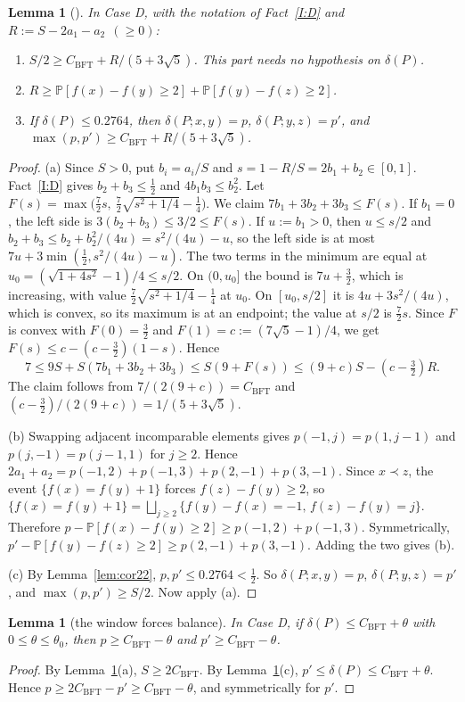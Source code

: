 \documentclass[10pt]{amsart}
\newtheorem{lemma}[theorem]{Lemma}
\theoremstyle{definition}
\theoremstyle{remark}
\newcommand{\PP}{\mathbb{P}}
\newcommand{\CB}{C_{\mathrm{BFT}}}
\begin{document}
\begin{lemma}[{\cite[Lemma~2.4]{KSBFT}}]\label{lem:24}
In Case D, with the notation of Fact~\ref{I:D} and $R:=S-2a_1-a_2\ \ (\ge0)$:
\begin{enumerate}[label=(\alph*)]
\item $S/2\ge \CB+R/(5+3\sqrt5)$. This part needs no hypothesis on $\delta(P)$.
\item $R\ge \PP[f(x)-f(y)\ge2]+\PP[f(y)-f(z)\ge2]$.
\item If $\delta(P)\le0.2764$, then $\delta(P;x,y)=p$, $\delta(P;y,z)=p'$, and $\max(p,p')\ge\CB+R/(5+3\sqrt5)$.
\end{enumerate}
\end{lemma}
\begin{proof}
(a) Since $S>0$, put $b_i=a_i/S$ and $s=1-R/S=2b_1+b_2\in[0,1]$. Fact~\ref{I:D} gives $b_2+b_3\le\frac12$ and $4b_1b_3\le b_2^2$.
Let $F(s)=\max\bigl(\tfrac72s,\ \tfrac72\sqrt{s^2+1/4}-\tfrac14\bigr)$. We claim $7b_1+3b_2+3b_3\le F(s)$.
If $b_1=0$, the left side is $3(b_2+b_3)\le 3/2\le F(s)$.
If $u:=b_1>0$, then $u\le s/2$ and $b_2+b_3\le b_2+b_2^2/(4u)=s^2/(4u)-u$, so the left side is at most $7u+3\min(\frac12, s^2/(4u)-u)$.
The two terms in the minimum are equal at $u_0=(\sqrt{1+4s^2}-1)/4\le s/2$.
On $(0,u_0]$ the bound is $7u+\frac32$, which is increasing, with value $\frac72\sqrt{s^2+1/4}-\frac14$ at $u_0$.
On $[u_0,s/2]$ it is $4u+3s^2/(4u)$, which is convex, so its maximum is at an endpoint; the value at $s/2$ is $\frac72 s$.
Since $F$ is convex with $F(0)=\frac32$ and $F(1)=c:=(7\sqrt5-1)/4$, we get $F(s)\le c-(c-\frac32)(1-s)$.
Hence
\[
7\le 9S+S(7b_1+3b_2+3b_3)\le S(9+F(s))\le(9+c)S-(c-\tfrac32)R .
\]
The claim follows from $7/(2(9+c))=\CB$ and $(c-\frac32)/(2(9+c))=1/(5+3\sqrt5)$.

(b) Swapping adjacent incomparable elements gives $p(-1,j)=p(1,j-1)$ and $p(j,-1)=p(j-1,1)$ for $j\ge2$.
Hence $2a_1+a_2=p(-1,2)+p(-1,3)+p(2,-1)+p(3,-1)$.
Since $x\prec z$, the event $\{f(x)=f(y)+1\}$ forces $f(z)-f(y)\ge2$, so $\{f(x)=f(y)+1\}=\bigsqcup_{j\ge2}\{f(y)-f(x)=-1,\,f(z)-f(y)=j\}$.
Therefore $p-\PP[f(x)-f(y)\ge2]\ge p(-1,2)+p(-1,3)$.
Symmetrically, $p'-\PP[f(y)-f(z)\ge2]\ge p(2,-1)+p(3,-1)$. Adding the two gives (b).

(c) By Lemma~\ref{lem:cor22}, $p,p'\le0.2764<\frac12$. So $\delta(P;x,y)=p$, $\delta(P;y,z)=p'$, and $\max(p,p')\ge S/2$. Now apply (a).
\end{proof}

\begin{lemma}[the window forces balance]\label{lem:window}
In Case D, if $\delta(P)\le\CB+\theta$ with $0\le\theta\le\theta_0$, then $p\ge\CB-\theta$ and $p'\ge\CB-\theta$.
\end{lemma}
\begin{proof}
By Lemma~\ref{lem:24}(a), $S\ge 2\CB$. By Lemma~\ref{lem:24}(c), $p'\le\delta(P)\le\CB+\theta$. Hence $p\ge 2\CB-p'\ge\CB-\theta$, and symmetrically for $p'$.
\end{proof}
\end{document}
